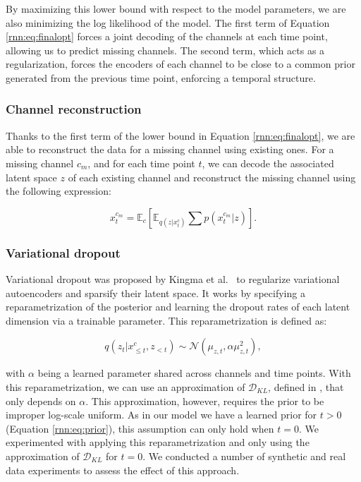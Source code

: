 By maximizing this lower bound with respect to the model parameters, we are also minimizing the log likelihood of the model. The first term of Equation \ref{rnn:eq:finalopt} forces a joint decoding of the channels at each time point, allowing us to predict missing channels. The second term, which acts as a regularization, forces the encoders of each channel to be close to a common prior generated from the previous time point, enforcing a temporal structure.

\subsubsection{Channel reconstruction}

Thanks to the first term of the lower bound in Equation \ref{rnn:eq:finalopt}, we are able to reconstruct the data for a missing channel using existing ones. For a missing channel $c_{m}$, and for each time point $t$, we can decode the associated latent space $z$ of each existing channel and reconstruct the missing channel using the following expression:

\begin{equation}
    x^{c_m}_t = \mathbb{E}_{c} [ \mathbb{E}_{q(z|x^c_t)} \sum p(x^{c_m}_t|z) ].
\end{equation}

\subsubsection{Variational dropout} 

Variational dropout was proposed by Kingma et al.\ \cite{Kingma2015} to regularize variational autoencoders and sparsify their latent space. It works by specifying a reparametrization of the posterior and learning the dropout rates of each latent dimension via a trainable parameter. This reparametrization is defined as:

\begin{equation}
    \mathit{q}(z_t | x^c_{\leq t}, z_{< t}) \sim \mathcal{N}(\mu_{z,t},\alpha\mu_{z,t}^2),
\end{equation}

with $\alpha$ being a learned parameter shared across channels and time points. With this reparametrization, we can use an approximation of $\mathcal{D}_{KL}$, defined in \cite{Kingma2015}, that only depends on $\alpha$. This approximation, however, requires the prior to be improper log-scale uniform. As in our model we have a learned prior for $t>0$ (Equation \ref{rnn:eq:prior}), this assumption can only hold when $t=0$. We experimented with applying this reparametrization and only using the approximation of $\mathcal{D}_{KL}$ for $t=0$. We conducted a number of synthetic and real data experiments to assess the effect of this approach.


